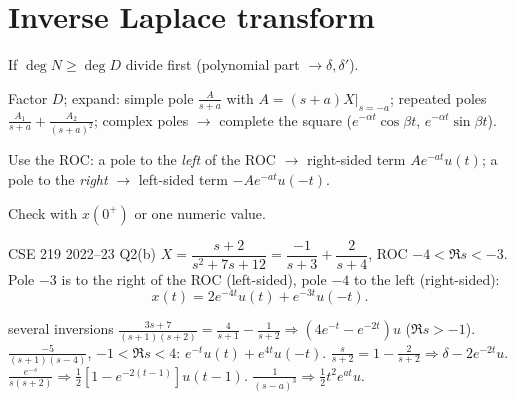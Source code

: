 \section{Inverse Laplace transform}
\begin{method}
\begin{steps}
\item If $\deg N\ge\deg D$ divide first (polynomial part $\to\delta,\delta'$).
\item Factor $D$; expand: simple pole $\frac A{s+a}$ with $A=(s+a)X\big|_{s=-a}$; repeated poles $\frac{A_1}{s+a}+\frac{A_2}{(s+a)^2}$; complex poles $\to$ complete the square ($e^{-\alpha t}\cos\beta t$, $e^{-\alpha t}\sin\beta t$).
\item Use the ROC: a pole to the \emph{left} of the ROC $\to$ right-sided term $Ae^{-at}u(t)$; a pole to the \emph{right} $\to$ left-sided term $-Ae^{-at}u(-t)$.
\item Check with $x(0^+)$ or one numeric value.
\end{steps}
\end{method}
\begin{example}{CSE 219 2022--23 Q2(b)}
$X=\dfrac{s+2}{s^2+7s+12}=\dfrac{-1}{s+3}+\dfrac2{s+4}$, ROC $-4<\Re s<-3$. Pole $-3$ is to the right of the ROC (left-sided), pole $-4$ to the left (right-sided):
\[x(t)=2e^{-4t}u(t)+e^{-3t}u(-t).\]
\end{example}
\begin{example}{several inversions}
$\frac{3s+7}{(s+1)(s+2)}=\frac4{s+1}-\frac1{s+2}\Rightarrow(4e^{-t}-e^{-2t})u$ ($\Re s>-1$). $\frac{-5}{(s+1)(s-4)}$, $-1<\Re s<4$: $e^{-t}u(t)+e^{4t}u(-t)$. $\frac{s}{s+2}=1-\frac2{s+2}\Rightarrow\delta-2e^{-2t}u$. $\frac{e^{-s}}{s(s+2)}\Rightarrow\tfrac12[1-e^{-2(t-1)}]u(t-1)$. $\frac1{(s-a)^3}\Rightarrow\tfrac12t^2e^{at}u$.
\end{example}


